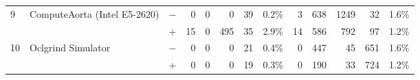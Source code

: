 \begin{tabular}{lll | rrrrr | rrrrr }
\hline
\multirow{ 2}{*}{9} & \multirow{ 2}{*}{ComputeAorta (Intel E5-2620)} & $-$ & 0 & 0 & 0 & 39 & 0.2\%       & 3 & 638 & 1249 & 32 & 1.6\% \\& & $+$ & 15 & 0 & 495 & 35 & 2.9\% & 14 & 586 & 792 & 97 & 1.2\% \\
\hline
\multirow{ 2}{*}{10} & \multirow{ 2}{*}{Oclgrind Simulator} & $-$ & 0 & 0 & 0 & 21 & 0.4\%       & 0 & 447 & 45 & 651 & 1.6\% \\& & $+$ & 0 & 0 & 0 & 19 & 0.3\% & 0 & 190 & 33 & 724 & 1.2\% \\
  \bottomrule
\end{tabular}

